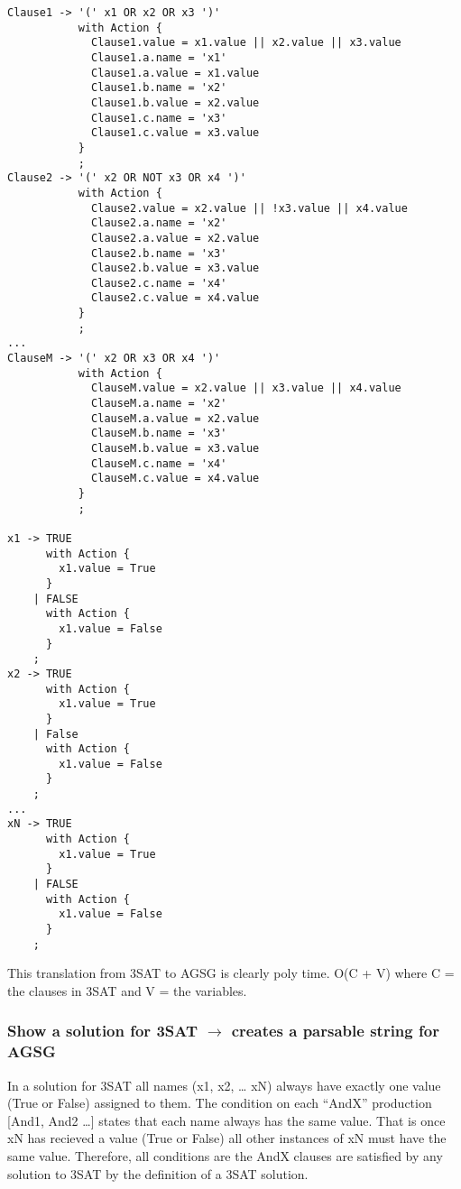 \begin{verbatim}
Clause1 -> '(' x1 OR x2 OR x3 ')'
           with Action {
             Clause1.value = x1.value || x2.value || x3.value
             Clause1.a.name = 'x1'
             Clause1.a.value = x1.value
             Clause1.b.name = 'x2'
             Clause1.b.value = x2.value
             Clause1.c.name = 'x3'
             Clause1.c.value = x3.value
           }
           ;
Clause2 -> '(' x2 OR NOT x3 OR x4 ')'
           with Action {
             Clause2.value = x2.value || !x3.value || x4.value
             Clause2.a.name = 'x2'
             Clause2.a.value = x2.value
             Clause2.b.name = 'x3'
             Clause2.b.value = x3.value
             Clause2.c.name = 'x4'
             Clause2.c.value = x4.value
           }
           ;
...
ClauseM -> '(' x2 OR x3 OR x4 ')'
           with Action {
             ClauseM.value = x2.value || x3.value || x4.value
             ClauseM.a.name = 'x2'
             ClauseM.a.value = x2.value
             ClauseM.b.name = 'x3'
             ClauseM.b.value = x3.value
             ClauseM.c.name = 'x4'
             ClauseM.c.value = x4.value
           }
           ;

x1 -> TRUE
      with Action {
        x1.value = True
      }
    | FALSE
      with Action {
        x1.value = False
      }
    ;
x2 -> TRUE
      with Action {
        x1.value = True
      }
    | False
      with Action {
        x1.value = False
      }
    ;
...
xN -> TRUE
      with Action {
        x1.value = True
      }
    | FALSE
      with Action {
        x1.value = False
      }
    ;
\end{verbatim}
This translation from 3SAT to AGSG is clearly poly time.
O(\textbar{}C\textbar{} + \textbar{}V\textbar{}) where C = the clauses
in 3SAT and V = the variables.

\subsubsection{Show a solution for 3SAT $\rightarrow$ creates a
parsable string for AGSG}

In a solution for 3SAT all names (x1, x2, \ldots{} xN) always have
exactly one value (True or False) assigned to them. The condition on
each ``AndX'' production {[}And1, And2 \ldots{}{]} states that each name
always has the same value. That is once xN has recieved a value (True or
False) all other instances of xN must have the same value. Therefore,
all conditions are the AndX clauses are satisfied by any solution to
3SAT by the definition of a 3SAT solution.

